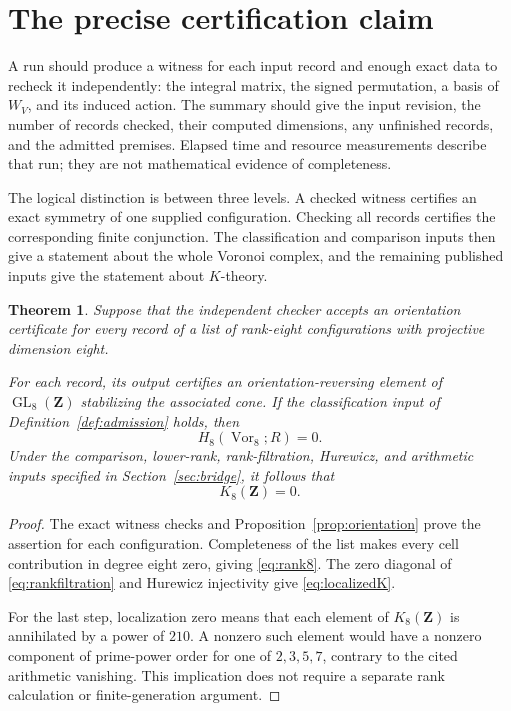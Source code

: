 \documentclass[11pt,a4paper]{article}
\numberwithin{equation}{section}
\newtheorem{theorem}[proposition]{Theorem}
\theoremstyle{definition}
\theoremstyle{remark}
\newcommand{\Z}{\mathbf Z}
\newcommand{\GL}{\operatorname{GL}}
\newcommand{\Vor}{\operatorname{Vor}}
\begin{document}
\section{The precise certification claim}\label{sec:claim}

A run should produce a witness for each input record and enough exact
data to recheck it independently: the integral matrix, the signed
permutation, a basis of \(W_V\), and its induced action.
The summary should give the input revision, the number of records
checked, their computed dimensions, any unfinished records, and the
admitted premises. Elapsed time and resource measurements describe
that run; they are not mathematical evidence of completeness.

The logical distinction is between three levels. A checked witness
certifies an exact symmetry of one supplied configuration.
Checking all records certifies the corresponding finite conjunction.
The classification and comparison inputs then give a statement
about the whole Voronoi complex, and the remaining published inputs
give the statement about \(K\)-theory.

\begin{theorem}\label{thm:certificate}
Suppose that the independent checker accepts an orientation certificate
for every record of a list of rank-eight configurations with
projective dimension eight.

For each record, its output certifies an orientation-reversing element
of \(\GL_8(\Z)\) stabilizing the associated cone.
If the classification input of Definition~\ref{def:admission} holds,
then
\[
 H_8(\Vor_8;R)=0.
\]
Under the comparison, lower-rank, rank-filtration, Hurewicz, and
arithmetic inputs specified in Section~\ref{sec:bridge}, it follows
that
\[
 \boxed{K_8(\Z)=0.}
\]
\end{theorem}

\begin{proof}
The exact witness checks and Proposition~\ref{prop:orientation} prove
the assertion for each configuration. Completeness of the list makes
every cell contribution in degree eight zero, giving
\eqref{eq:rank8}. The zero diagonal of \eqref{eq:rankfiltration}
and Hurewicz injectivity give \eqref{eq:localizedK}.

For the last step, localization zero means that each element of
\(K_8(\Z)\) is annihilated by a power of \(210\).
A nonzero such element would have a nonzero component of prime-power
order for one of \(2,3,5,7\), contrary to the cited arithmetic
vanishing. This implication does not require a separate rank
calculation or finite-generation argument.
\end{proof}
\end{document}
